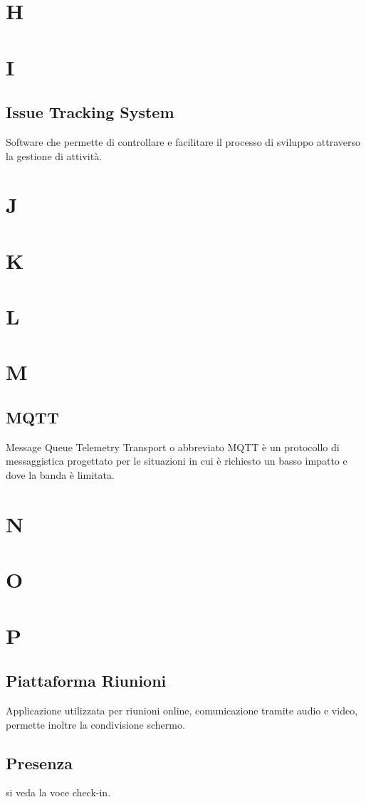 \section{H}
\section{I}
\subsection{Issue Tracking System}
Software che permette di controllare e facilitare il processo di sviluppo attraverso la gestione di attività.
\newpage
\section{J}
\section{K}
\section{L}
\section{M}
\subsection{MQTT}
Message Queue Telemetry Transport o abbreviato MQTT è un protocollo di messaggistica progettato per le situazioni in cui è richiesto
un basso impatto e dove la banda è limitata.
\newpage
\section{N}
\section{O}
\section{P}
\subsection{Piattaforma Riunioni}
Applicazione utilizzata per riunioni online, comunicazione tramite audio e video, permette inoltre la condivisione schermo.
\subsection{Presenza}
si veda la voce check-in. 
